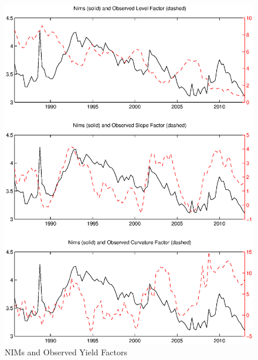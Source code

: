 \documentclass[11pt]{article}
\begin{document}
\newpage \clearpage
\begin{figure}
\caption{NIMs and Observed Yield Factors} \label{figure_nims_factors}
\center
\includegraphics[scale=0.8]{figure_nims_factors.ps}
\end{figure}
\end{document}
